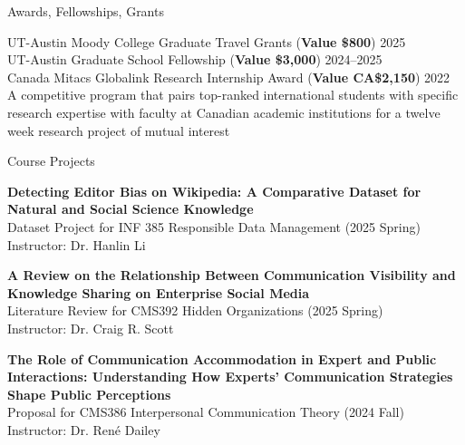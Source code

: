 \documentclass[
	11pt, %
]{resume} %
\begin{document}
\begin{rSection}{Awards, Fellowships, Grants}
	
	UT-Austin Moody College Graduate Travel Grants (\textbf{Value \$800})  \hfill 2025\\
	UT-Austin Graduate School Fellowship   (\textbf{Value \$3,000})  \hfill 2024--2025\\
    Canada Mitacs Globalink Research Internship Award     (\textbf{Value CA\$2,150})  \hfill 2022\\
\textbullet\enspace  A competitive program that pairs top-ranked international students with specific research expertise with faculty at Canadian academic institutions for a twelve week research project of mutual interest\\
	
\end{rSection}


\begin{rSection}{Course Projects}

	\textbf{Detecting Editor Bias on Wikipedia: A Comparative Dataset for Natural and Social Science Knowledge} \\
    Dataset Project for INF 385 Responsible Data Management (2025 Spring)\\ Instructor: Dr. Hanlin Li 
    
	\textbf{A Review on the Relationship Between Communication Visibility and Knowledge Sharing on Enterprise Social Media}\\
    Literature Review for CMS392 Hidden Organizations (2025 Spring)\\
    Instructor: Dr. Craig R. Scott 
	

	\textbf{The Role of Communication Accommodation in Expert and Public Interactions: Understanding How Experts’ Communication Strategies Shape Public Perceptions}\\
    Proposal for CMS386 Interpersonal Communication Theory (2024 Fall)\\
    Instructor: Dr. René Dailey\\

	
\end{rSection}


\end{document}
